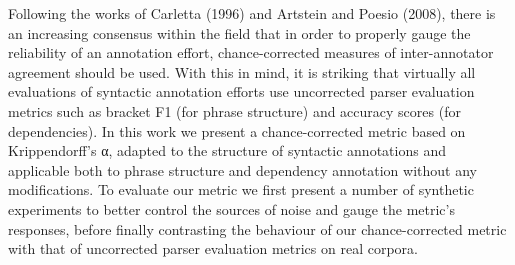 Following the works of Carletta (1996) and Artstein and Poesio (2008), there is an increasing consensus within the field that in order to properly gauge the reliability of an annotation effort, chance-corrected measures of inter-annotator agreement should be used. With this in mind, it is striking that virtually all evaluations of syntactic annotation efforts use uncorrected parser evaluation metrics such as bracket F1 (for phrase structure) and accuracy scores (for dependencies). In this work we present a chance-corrected metric based on Krippendorff's α, adapted to the structure of syntactic annotations and applicable both to phrase structure and dependency annotation without any modifications. To evaluate our metric we first present a number of synthetic experiments to better control the sources of noise and gauge the metric's responses, before finally contrasting the behaviour of our chance-corrected metric with that of uncorrected parser evaluation metrics on real corpora.
